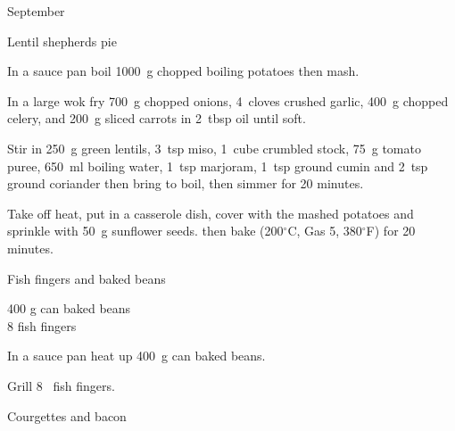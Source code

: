 \begin{menu}{September}
\begin{recipe}{2}{Lentil shepherds pie}
\begin{ingredients}
		\end{ingredients}
	
	
    \begin{instructions}
    \item 
        In a sauce pan boil
        1000~g chopped boiling potatoes
        then mash.
      \item 
        In a large wok fry
        700~g chopped onions,
        4~cloves crushed garlic,
        400~g chopped celery,
        and
        200~g sliced carrots
        in
        2~tbsp  oil
        until soft.
      \item 
        Stir in
        250~g  green lentils,
        3~tsp  miso,
        1~cube crumbled stock,
        75~g  tomato puree,
        650~ml  boiling water,
        1~tsp  marjoram,
        1~tsp  ground cumin
        and
        2~tsp  ground coriander
        then bring to boil,
        then simmer for 20 minutes.
      \item 
        Take off heat,
        put in a casserole dish,
        cover with the mashed potatoes
        and sprinkle with
        50~g  sunflower seeds.
        then bake 
      (200$^{\circ}$C, Gas 5, 380$^{\circ}$F)
     for 20 minutes.
      
    \end{instructions}
    \end{recipe}%
  
    \begin{recipe}{1}{Fish fingers and baked beans}%
    
		\begin{ingredients}
		400 g can baked beans  \\
	8  fish fingers  \\
	
		\end{ingredients}
	
    \begin{instructions}
    \item 
        In a sauce pan heat up
        400~g  can baked beans.
      \item 
        Grill
        8~  fish fingers.
      
    \end{instructions}
    \end{recipe}%
  
    \begin{recipe}{2}{Courgettes and bacon}%
    

\end{recipe}
\end{menu}
